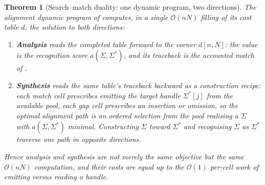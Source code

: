 \documentclass[11pt,twocolumn,a4paper]{article}
\theoremstyle{thmstyle}
\newtheorem{theorem}{Theorem}[section]
\theoremstyle{definition}
\theoremstyle{remark}
\newcommand{\sig}{\Sigma}
\newcommand{\algn}{a}
\newcommand{\bigOh}{\mathcal{O}}
\begin{document}
\begin{theorem}[Search--match duality: one dynamic program, two directions]
\label{thm:duality}
The alignment dynamic program of  computes, in a single
$\bigOh(nN)$ filling of its cost table $d$, the solution to both directions:
\begin{enumerate}[label=\textup{(\roman*)},leftmargin=2.2em]
\item \textbf{Analysis} reads the completed table \emph{forward} to the corner
$d[n,N]$: the value is the recognition score $\algn(\sig,\sig^{\ast})$, and its
traceback is the accounted match of .
\item \textbf{Synthesis} reads the \emph{same} table's traceback \emph{backward}
as a construction recipe: each match cell prescribes emitting the target handle
$\sig^{\ast}[j]$ from the available pool, each gap cell prescribes an insertion
or omission, so the optimal alignment path \emph{is} an ordered selection from
the pool realising a $\sig$ with $\algn(\sig,\sig^{\ast})$ minimal. Constructing
$\sig$ toward $\sig^{\ast}$ and recognising $\sig$ as $\sig^{\ast}$ traverse one
path in opposite directions.
\end{enumerate}
Hence analysis and synthesis are not merely the same objective but the same
$\bigOh(nN)$ computation, and their costs are equal up to the $\bigOh(1)$ per-cell
work of emitting versus reading a handle.
\end{theorem}
\end{document}
